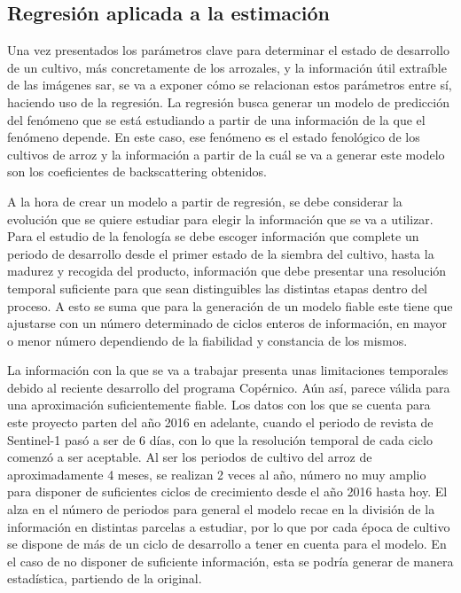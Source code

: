 \subsection{Regresión aplicada a la estimación}
\par Una vez presentados los parámetros clave para determinar el estado de desarrollo de un cultivo, más concretamente de los arrozales, y la  información útil extraíble de las imágenes \gls{sar}, se va a exponer cómo se relacionan estos parámetros entre sí, haciendo uso de la regresión. La regresión busca generar un modelo de predicción del fenómeno que se está estudiando a partir de una información de la que el fenómeno depende. En este caso, ese fenómeno es el estado fenológico de los cultivos de arroz y la información a partir de la cuál se va a generar este modelo son los coeficientes de backscattering obtenidos.
\\
\par A la hora de crear un modelo a partir de regresión, se debe considerar la evolución que se quiere estudiar para elegir la información que se va a utilizar. Para el estudio de la fenología se debe escoger información que complete un periodo de desarrollo desde el primer estado de la siembra del cultivo, hasta la madurez y recogida del producto, información que debe presentar una resolución temporal suficiente para que sean distinguibles las distintas etapas dentro del proceso. A esto se suma que para la generación de un modelo fiable este tiene que ajustarse con un número determinado de ciclos enteros de información, en mayor o menor número dependiendo de la fiabilidad y constancia de los mismos. 
\\
\par La información con la que se va a trabajar presenta unas limitaciones temporales debido al reciente desarrollo del programa Copérnico. Aún así, parece válida para una aproximación suficientemente fiable. Los datos con los que se cuenta para este proyecto parten del año 2016 en adelante, cuando el periodo de revista de Sentinel-1 pasó a ser de 6 días, con lo que la resolución temporal de cada ciclo comenzó a ser aceptable. Al ser los periodos de cultivo del arroz de aproximadamente 4 meses, se realizan 2 veces al año, número no muy amplio para disponer de suficientes ciclos de crecimiento desde el año 2016 hasta hoy. El alza en el número de periodos para general el modelo recae en la división de la información en distintas parcelas a estudiar, por lo que por cada época de cultivo se dispone de más de un ciclo de desarrollo a tener en cuenta para el modelo. En el caso de no disponer de suficiente información, esta se podría generar de manera estadística, partiendo de la original. 
